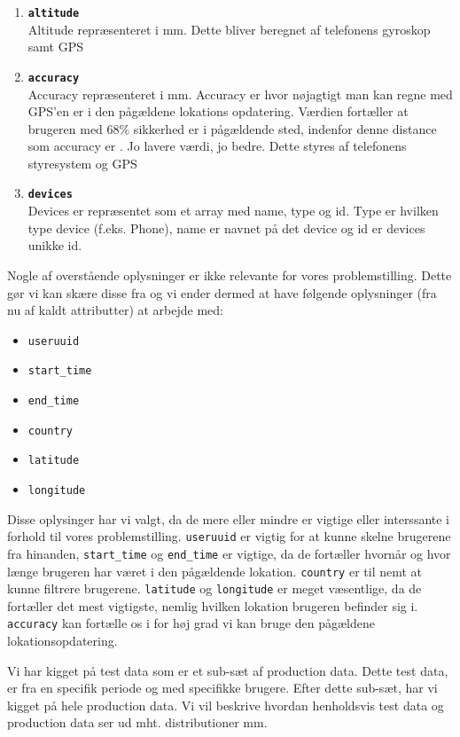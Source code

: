 \begin{enumerate}
\item \texttt{\textbf{altitude}}\\Altitude repræsenteret i mm. Dette bliver beregnet af telefonens gyroskop samt GPS
\item \texttt{\textbf{accuracy}}\\Accuracy repræsenteret i mm. Accuracy er hvor nøjagtigt man kan regne med GPS'en er i den pågældene lokations opdatering. Værdien fortæller at brugeren med 68\% sikkerhed er i pågældende sted, indenfor denne distance som accuracy er \cite{android_accuracy}. Jo lavere værdi, jo bedre. Dette styres af telefonens styresystem og GPS
\item \texttt{\textbf{devices}}\\Devices er repræsentet som et array med name, type og id. Type er hvilken type device (f.eks. Phone), name er navnet på det device og id er devices unikke id. 
\end{enumerate}

Nogle af overstående oplysninger er ikke relevante for vores problemstilling. Dette gør vi kan skære disse fra og vi ender dermed at have følgende oplysninger (fra nu af kaldt  attributter) at arbejde med: 

\begin{itemize}
\item \texttt{useruuid}
\item \texttt{start\_time}
\item \texttt{end\_time}
\item \texttt{country}
\item \texttt{latitude}
\item \texttt{longitude}
\end{itemize}

Disse oplysinger har vi valgt, da de mere eller mindre er vigtige eller interssante i forhold til vores problemstilling. \texttt{useruuid} er vigtig for at kunne skelne brugerene fra hinanden, \texttt{start\_time} og \texttt{end\_time} er vigtige, da de fortæller hvornår og hvor længe brugeren har været i den pågældende lokation. \texttt{country} er til nemt at kunne filtrere brugerene. \texttt{latitude} og \texttt{longitude} er meget væsentlige, da de fortæller det mest vigtigste, nemlig hvilken lokation brugeren befinder sig i. \texttt{accuracy} kan fortælle os i for høj grad vi kan bruge den pågældene lokationsopdatering.  


Vi har kigget på test data som er et sub-sæt af production data. Dette test data, er fra en specifik periode og med specifikke brugere. Efter dette sub-sæt, har vi kigget på hele production data. Vi vil beskrive hvordan henholdsvis test data og production data ser ud mht. distributioner mm. 

